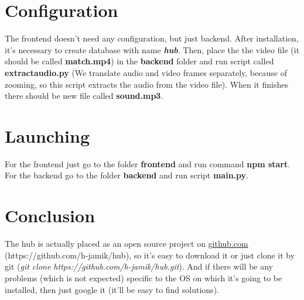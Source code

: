 \documentclass[10pt]{article}
\begin{document}
\section{Configuration}
The frontend doesn't need any configuration, but just backend. After installation, it's necessary to create database with name \textbf{\textit{hub}}. Then, place the the video file (it should be called \textbf{match.mp4}) in the \textbf{backend} folder and run script called \textbf{extractaudio.py} (We translate audio and video frames separately, because of zooming, so this script extracts the audio from the video file). When it finishes there should be new file called \textbf{sound.mp3}.

\section{Launching}
For the frontend just go to the folder \textbf{frontend} and run command \textbf{npm start}.
\linebreak
For the backend go to the folder \textbf{backend} and run script \textbf{main.py}.

\section{Conclusion}
The hub is actually placed as an open source project on \href{https://github.com/h-jamik/hub}{github.com} (https://github.com/h-jamik/hub), so it's easy to download it or just clone it by git (\textit{git clone https://github.com/h-jamik/hub.git}). And if there will be any problems (which is not expected) specific to the OS on which it's going to be installed, then just google it (it'll be easy to find solutions).
\end{document}

